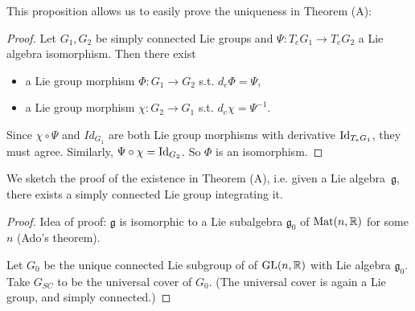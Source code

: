     This proposition allows us to easily prove the uniqueness in Theorem (A):
    \begin{proof} Let $G_1,G_2$ be simply connected Lie  groups
and $\Psi:T_eG_1\to T_eG_2$ a Lie algebra isomorphism. Then there exist 
\begin{itemize}
\item a Lie group morphism $\Phi\colon G_1\to G_2$ s.t. $   d_e \Phi = \Psi$,  
 \item a Lie group morphism $\chi\colon G_2\to G_1$ s.t. $   d_e \chi = \Psi^{-1}$.
\end{itemize}
Since $\chi\circ  \Psi$ and $Id_{G_1}$ are both Lie group morphisms with derivative $\operatorname{Id}_{T_eG_1}$, they must agree. Similarly, $\Psi\circ \chi=\operatorname{Id}_{G_2}$.
So $\Phi$ is an isomorphism. 
    \end{proof}
 
    \filbreak
We sketch the proof of the existence in Theorem (A), i.e. given a Lie algebra~$ \mathfrak g$, there exists a simply connected Lie group integrating it.
\begin{proof}
    Idea of proof:
    $\mathfrak g$ is isomorphic to a Lie subalgebra   $\mathfrak g_0$ of $\operatorname{Mat}(n, \mathbb{R})$ for some $n$ (Ado's theorem).
    
    Let $G_0$ be the unique connected Lie subgroup of of $\operatorname{GL}(n, \mathbb{R})$ with Lie algebra $\mathfrak g_0$.
Take $G_{SC}$ to be the universal cover of $G_0$. (The universal cover is again a Lie group, and simply connected.)
\end{proof}
